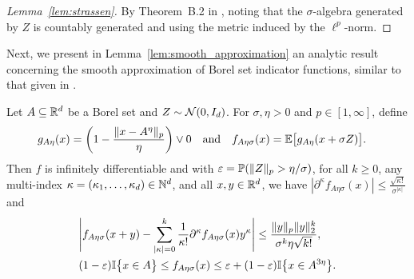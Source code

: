 \begin{proof}[Lemma~\ref{lem:strassen}]
  By Theorem~B.2 in \citet{chen2020jackknife}, noting that the $\sigma$-algebra
  generated by $Z$ is countably generated and using the metric induced by the
  $\ell^p$-norm.
\end{proof}

Next, we present in Lemma~\ref{lem:smooth_approximation} an analytic result
concerning the smooth approximation of Borel set indicator functions, similar
to that given in \citet[Lemma~39]{belloni2019conditional}.

\begin{lemma}%
  \label{lem:smooth_approximation}
  Let $A \subseteq \R^d$ be a Borel set and $Z \sim \cN(0, I_d)$.
  For $\sigma, \eta > 0$ and $p \in [1, \infty]$, define
  \begin{align*}
    g_{A\eta}(x)
    &=
    \left( 1 - \frac{\|x-A^\eta\|_p}{\eta} \right) \vee 0
    &                  &\text{and}
    &f_{A\eta\sigma}(x)
    &=
    \E\big[g_{A\eta}(x + \sigma Z) \big].
  \end{align*}
  Then $f$ is infinitely differentiable
  and with $\varepsilon = \P(\|Z\|_p > \eta / \sigma)$,
  for all $k \geq 0$,
  any multi-index $\kappa = (\kappa_1,\dots, \kappa_d)\in\N^d$,
  and all $x,y \in \R^d$,
  we have $|\partial^\kappa f_{A\eta\sigma}(x)| \leq
  \frac{\sqrt{\kappa!}}{\sigma^{|\kappa|}}$ and
  \begin{align*}
    &\Bigg|
    f_{A\eta\sigma}(x+y) - \sum_{|\kappa| = 0}^k
    \frac{1}{\kappa!}
    \partial^\kappa f_{A\eta\sigma}(x)
    y^\kappa
    \Bigg|
    \leq
    \frac{\|y\|_p \|y\|_2^k}{\sigma^k \eta \sqrt{k!}}, \\
    &(1 - \varepsilon) \I\big\{x \in A\big\}
    \leq f_{A\eta\sigma}(x)
    \leq \varepsilon + (1 - \varepsilon)
    \I\big\{x \in A^{3\eta}\big\}.
  \end{align*}
\end{lemma}

